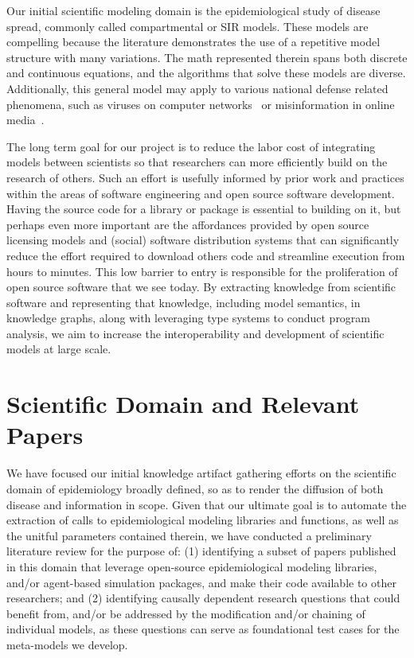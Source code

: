 \documentclass{article}
\begin{document}
Our initial scientific modeling domain is the epidemiological study of disease
spread, commonly called compartmental or SIR models.
These models are compelling because the literature demonstrates the use of 
a repetitive model structure with many variations.  The math represented therein spans both discrete and continuous equations, and the algorithms that solve these models are diverse. Additionally, this general model may apply to various national defense
related phenomena, such as viruses on computer networks~\cite{cohen_efficient_2003}
or misinformation in online media~\cite{budak_limiting_2011}.

The long term goal for our project is to reduce the labor cost of integrating models between scientists so that researchers can more efficiently build on the research of others. Such an effort is usefully informed by prior work and practices within the areas of software engineering and open source software development. Having the source code for a library or package is essential to building on it, but perhaps even more important are the affordances provided by open source licensing models and (social) software distribution systems that can significantly reduce the effort required to download others code and streamline execution from hours to minutes. This low barrier to entry is responsible for the proliferation of open source software that we see today.
By extracting knowledge from scientific software and representing that knowledge, including model semantics, in knowledge graphs, along with leveraging type systems to conduct program analysis, we aim to increase the interoperability and development of scientific models at large scale.

\setcounter{secnumdepth}{2}
\setcounter{tocdepth}{2}
\newpage
\tableofcontents

\section{Scientific Domain and Relevant Papers}


We have focused our initial knowledge artifact gathering efforts on the scientific domain of epidemiology broadly defined, so as to render the diffusion of both disease and information in scope. Given that our ultimate goal is to automate the extraction of calls to epidemiological modeling libraries and functions, as well as the unitful parameters contained therein, we have conducted a preliminary literature review for the purpose of: (1) identifying a subset of papers published in this domain that leverage open-source epidemiological modeling libraries, and/or agent-based simulation packages, and make their code available to other researchers; and (2) identifying causally dependent research questions that could benefit from, and/or be addressed by the modification and/or chaining of individual models, as these questions can serve as foundational test cases for the meta-models we develop. 
\end{document}
